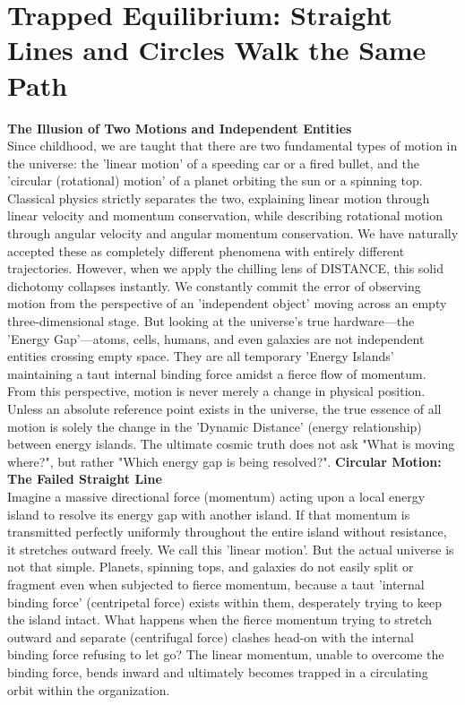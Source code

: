 

\section{Trapped Equilibrium: Straight Lines and Circles Walk the Same Path}
\textbf{The Illusion of Two Motions and Independent Entities} \\
Since childhood, we are taught that there are two fundamental types of motion in the universe: the 'linear motion' of a speeding car or a fired bullet, and the 'circular (rotational) motion' of a planet orbiting the sun or a spinning top. Classical physics strictly separates the two, explaining linear motion through linear velocity and momentum conservation, while describing rotational motion through angular velocity and angular momentum conservation. We have naturally accepted these as completely different phenomena with entirely different trajectories.
However, when we apply the chilling lens of DISTANCE, this solid dichotomy collapses instantly. We constantly commit the error of observing motion from the perspective of an 'independent object' moving across an empty three-dimensional stage. But looking at the universe's true hardware—the 'Energy Gap'—atoms, cells, humans, and even galaxies are not independent entities crossing empty space. They are all temporary 'Energy Islands' maintaining a taut internal binding force amidst a fierce flow of momentum.
From this perspective, motion is never merely a change in physical position. Unless an absolute reference point exists in the universe, the true essence of all motion is solely the change in the 'Dynamic Distance' (energy relationship) between energy islands. The ultimate cosmic truth does not ask "What is moving where?", but rather "Which energy gap is being resolved?".
\textbf{Circular Motion: The Failed Straight Line} \\
Imagine a massive directional force (momentum) acting upon a local energy island to resolve its energy gap with another island. If that momentum is transmitted perfectly uniformly throughout the entire island without resistance, it stretches outward freely. We call this 'linear motion'.
But the actual universe is not that simple. Planets, spinning tops, and galaxies do not easily split or fragment even when subjected to fierce momentum, because a taut 'internal binding force' (centripetal force) exists within them, desperately trying to keep the island intact.
What happens when the fierce momentum trying to stretch outward and separate (centrifugal force) clashes head-on with the internal binding force refusing to let go? The linear momentum, unable to overcome the binding force, bends inward and ultimately becomes trapped in a circulating orbit within the organization.

